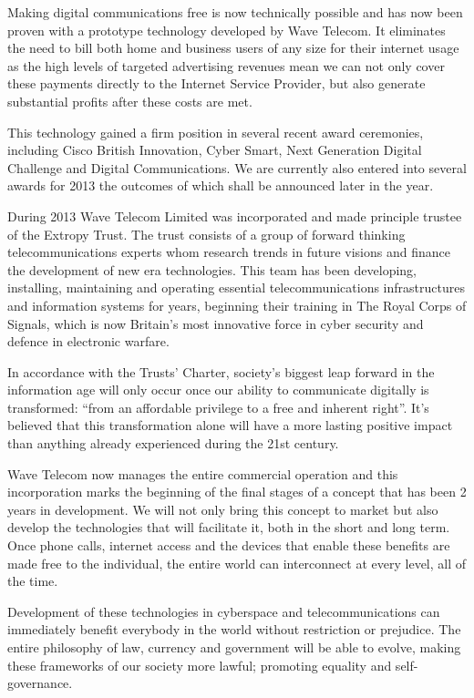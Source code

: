 \documentclass[letterpaper,10pt,openany,oneside,english]{sphinxmanual}
\begin{document}
Making digital communications free is now technically possible and has now been proven with a
prototype technology developed by Wave Telecom. It eliminates the need to bill both home
and business users of any size for their internet usage as the high levels of targeted advertising
revenues mean we can not only cover these payments directly to the Internet Service Provider,
but also generate substantial profits after these costs are met.

This technology gained a firm position in several recent award ceremonies, including Cisco
British Innovation, Cyber Smart, Next Generation Digital Challenge and Digital Communications.
We are currently also entered into several awards for 2013 the outcomes of which shall be
announced later in the year.

During 2013 Wave Telecom Limited was incorporated and made principle trustee of the Extropy
Trust. The trust consists of a group of forward thinking telecommunications experts whom
research trends in future visions and finance the development of new era technologies.
This team has been developing, installing, maintaining and operating essential
telecommunications infrastructures and information systems for years, beginning their training
in The Royal Corps of Signals, which is now Britain’s most innovative force in cyber security and
defence in electronic warfare.

In accordance with the Trusts’ Charter, society’s biggest leap forward in the information age will
only occur once our ability to communicate digitally is transformed: “from an affordable
privilege to a free and inherent right”. It’s believed that this transformation alone will have
a more lasting positive impact than anything already experienced during the 21st
century.

Wave Telecom now manages the entire commercial operation and this incorporation marks the
beginning of the final stages of a concept that has been 2 years in development. We will not
only bring this concept to market but also develop the technologies that will facilitate it, both in
the short and long term. Once phone calls, internet access and the devices that enable these
benefits are made free to the individual, the entire world can interconnect at every level, all of
the time.

Development of these technologies in cyberspace and telecommunications can immediately
benefit everybody in the world without restriction or prejudice. The entire philosophy of law,
currency and government will be able to evolve, making these frameworks of our society more
lawful; promoting equality and self-governance.
\end{document}
